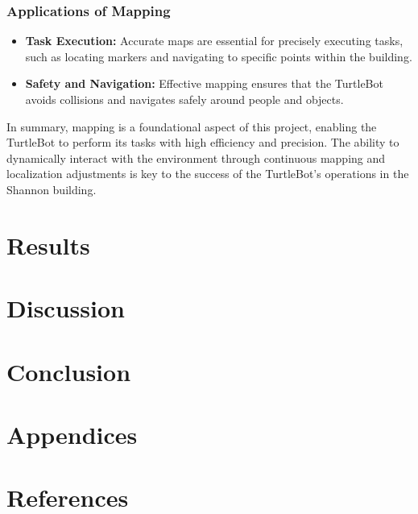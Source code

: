 \documentclass{article}
\begin{document}
	\subsubsection{Applications of Mapping}
	\begin{itemize}
		\item \textbf{Task Execution:} Accurate maps are essential for precisely executing tasks, such as locating markers and navigating to specific points within the building.
		\item \textbf{Safety and Navigation:} Effective mapping ensures that the TurtleBot avoids collisions and navigates safely around people and objects.
	\end{itemize}
	In summary, mapping is a foundational aspect of this project, enabling the TurtleBot to perform its tasks with high efficiency and precision. The ability to dynamically interact with the environment through continuous mapping and localization adjustments is key to the success of the TurtleBot's operations in the Shannon building.
	
	\section{Results}
	\section{Discussion}
	\section{Conclusion}
	\section{Appendices}
	\section{References}
\end{document}
